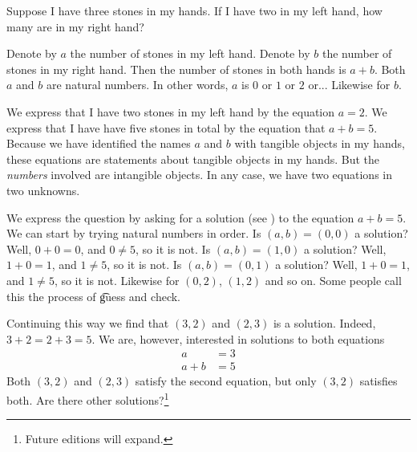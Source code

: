 

Suppose I have three stones in my hands.
If I have two in my left hand, how many are in my right hand?


Denote by $a$ the number of stones in my left hand.
Denote by $b$ the number of stones in my right hand.
Then the number of stones in both hands is $a + b$.
Both $a$ and $b$ are natural numbers.
In other words, $a$ is $0$ or $1$ or $2$ or...
Likewise for $b$.

We express that I have two stones in my left hand by the equation $a = 2$.
We express that I have have five stones in total by the equation that $a + b = 5$.
Because we have identified the names $a$ and $b$ with tangible objects in my hands, these equations are statements about tangible objects in my hands.
But the \textit{numbers} involved are intangible objects.
In any case, we have two equations in two unknowns.

We express the question  by asking for a solution (see ) to the equation $a + b = 5$.
We can start by trying natural numbers in order.
Is $(a, b) = (0, 0)$ a solution?
Well, $0 + 0 = 0$, and $0 \neq 5$, so it is not.
Is $(a, b) = (1, 0)$ a solution?
Well, $1 + 0 = 1$, and $1 \neq 5$, so it is not.
Is $(a, b) = (0, 1)$ a solution?
Well, $1 + 0 = 1$, and $1 \neq 5$, so it is not.
Likewise for $(0, 2)$, $(1, 2)$ and so on.
Some people call this the process of \t{guess and check}.

Continuing this way we find that $(3, 2)$ and $(2, 3)$ is a solution.
Indeed, $3 + 2 = 2 + 3 = 5$.
We are, however, interested in solutions to both equations
\[
  \begin{aligned}
  a &= 3 \\
  a + b &= 5
  \end{aligned}
\]
Both $(3, 2)$ and $(2, 3)$ satisfy the second equation, but only $(3, 2)$ satisfies both.
Are there other solutions?\footnote{Future editions will expand.}
